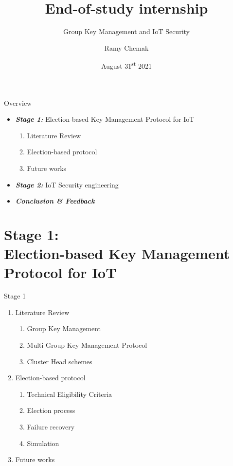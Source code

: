 \documentclass{beamer}
\title{End-of-study internship}
\subtitle{Group Key Management and IoT Security}
\author{Ramy Chemak}
\institute{\textit{INSA Centre Val de Loire} \\  \textit{Heudiasyc UMR CNRS 7253}}
\date{August 31\textsuperscript{st} 2021}
\begin{document}

\begin{frame}
	\maketitle %
\end{frame}

\begin{frame}{Overview}
	\begin{itemize}
		\item \textbf{\textit{Stage 1:}} Election-based Key Management Protocol for IoT
		\begin{enumerate}
			\item Literature Review
			\item Election-based protocol
			\item Future works
		\end{enumerate}
		\vfil
		\item \textbf{\textit{Stage 2:}} IoT Security engineering
		\vfil
		\item \textbf{\textit{Conclusion \& Feedback}}
	\end{itemize}
\end{frame}

\section{Stage 1: \\Election-based Key Management Protocol for IoT}

\begin{frame}{Stage 1}
	\begin{enumerate}
		\item Literature Review
		\begin{enumerate}
			\item Group Key Management
			\item Multi Group Key Management Protocol
			\item Cluster Head schemes
		\end{enumerate}
		\vfil
		\item Election-based protocol
		\begin{enumerate}
			\item Technical Eligibility Criteria
			\item Election process
			\item Failure recovery
			\item Simulation
		\end{enumerate}
		\vfil
		\item Future works
	\end{enumerate}
\end{frame}
\end{document}
